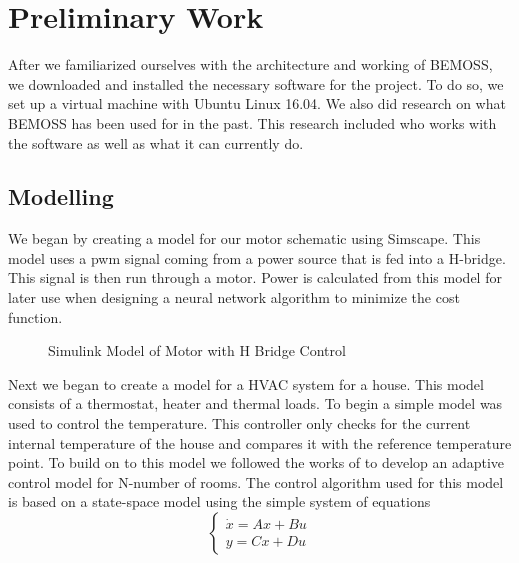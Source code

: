 \documentclass[letterpaper,12pt]{article}   %
\begin{document}
\section{Preliminary Work}
After we familiarized ourselves with the architecture and working of BEMOSS, we downloaded and installed the necessary software for the project. To do so, we set up a virtual machine with Ubuntu Linux 16.04. We also did research on what BEMOSS has been used for in the past. This research included who works with the software as well as what it can currently do. 
\subsection{Modelling} \label{sec:model}
We began by creating a model for our motor schematic using Simscape. This model uses a pwm signal coming from a power source that is fed into a H-bridge. This signal is then run through a motor. Power is calculated from this model for later use when designing a neural network algorithm to minimize the cost function.
\begin{figure}
  \centering
  \caption{Simulink Model of Motor with H Bridge Control}
  \label{fig:motorModelWithHBridge}
\end{figure}
Next we began to create a model for a HVAC system for a house. This model consists of a thermostat, heater and thermal loads. To begin a simple model was used to control the temperature. This controller only checks for the current internal temperature of the house and compares it with the reference temperature point. 
To build on to this model we followed the works of \cite{Reppa2015}\cite{Dhar2018} to develop an adaptive control model for N-number of rooms. 
The control algorithm used for this model is based on a state-space model using the simple system of equations
\begin{equation*}
    \begin{cases} \dot{x} = Ax+Bu \\ y = Cx + Du \end{cases}
\end{equation*}
\end{document}
